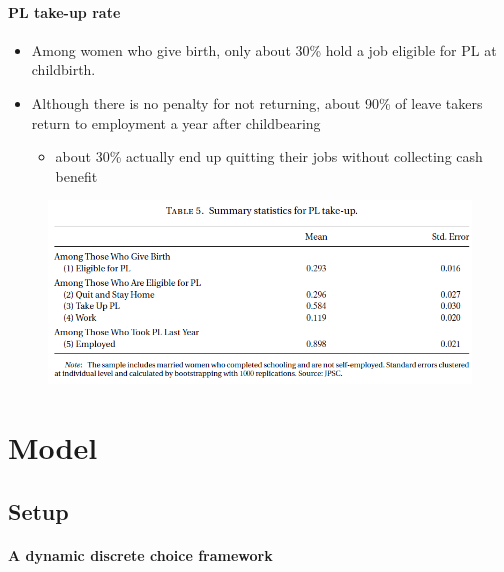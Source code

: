 \documentclass[../root]{subfiles}
\begin{document}
    \paragraph{PL take-up rate}

    \begin{itemize}
      \item Among women who give birth, only about 30\% hold a job eligible for PL at childbirth.
      \item Although there is no penalty for not returning, about 90\% of leave takers return to employment a year after childbearing
      \begin{itemize}
        \item about 30\% actually end up quitting their jobs without collecting cash benefit
      \end{itemize}
    \end{itemize}

    \begin{figure}[h]
      \centering
      \includegraphics[scale = 1]{0619tanji/T5}
      \label{T2}
    \end{figure}


    \section{Model}

    \subsection{Setup}

    \paragraph{A dynamic discrete choice framework}
\end{document}
